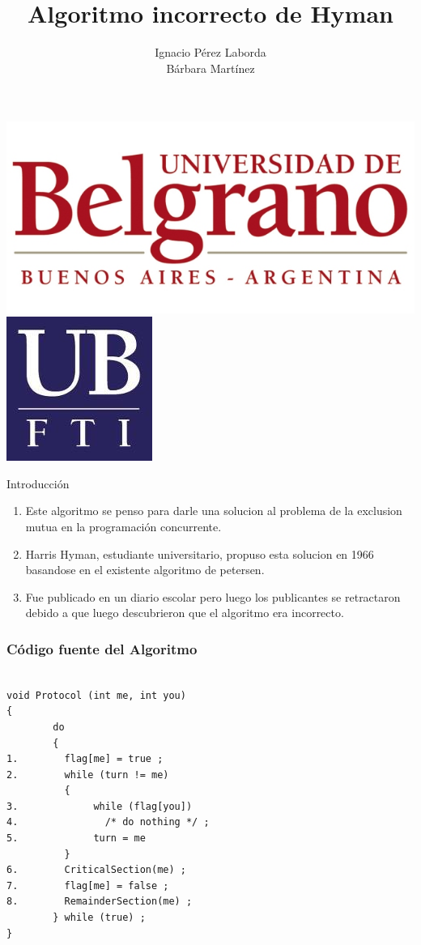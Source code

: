 \documentclass{beamer}
\title[Tecnologia]
{Algoritmo incorrecto de Hyman}
\subtitle{}
\author[Grupo 1] 
{Ignacio P\'erez Laborda\\B\'arbara Mart\'inez}
\institute[UB--FTI] 
{
  Facultad de Tecnolog\'ia Inform\'atica\\
  Universidad de Belgrano
}
\date[\today]
\begin{document}

\begin{frame}

\includegraphics[height=0.2\textheight]{ub2.jpg} \hspace*{6cm}
\includegraphics[height=0.19\textheight]{FTI.jpg}  
\\[-0.1cm]
\titlepage


\end{frame}

\begin{frame}{Introducción}
\begin{enumerate}
\item Este algoritmo se penso para darle una solucion al problema de la exclusion mutua en la programación concurrente.
\item  Harris Hyman, estudiante universitario, propuso esta solucion en 1966 basandose en el existente algoritmo de petersen.
\item Fue publicado en un diario escolar pero luego los publicantes se retractaron debido a que luego descubrieron que  el algoritmo era incorrecto.
\end{enumerate}

\end{frame}

\begin{frame}[fragile]

\frametitle{Código fuente del Algoritmo} \vspace*{-0.8 cm}
	\begin{verbatim}

void Protocol (int me, int you)
{
        do 
        {
1.        flag[me] = true ;
2.        while (turn != me)
          {
3.             while (flag[you])
4.               /* do nothing */ ;
5.             turn = me
          }
6.        CriticalSection(me) ;
7.        flag[me] = false ;
8.        RemainderSection(me) ;
        } while (true) ;
}

	\end{verbatim}

\end{frame}
\end{document}
